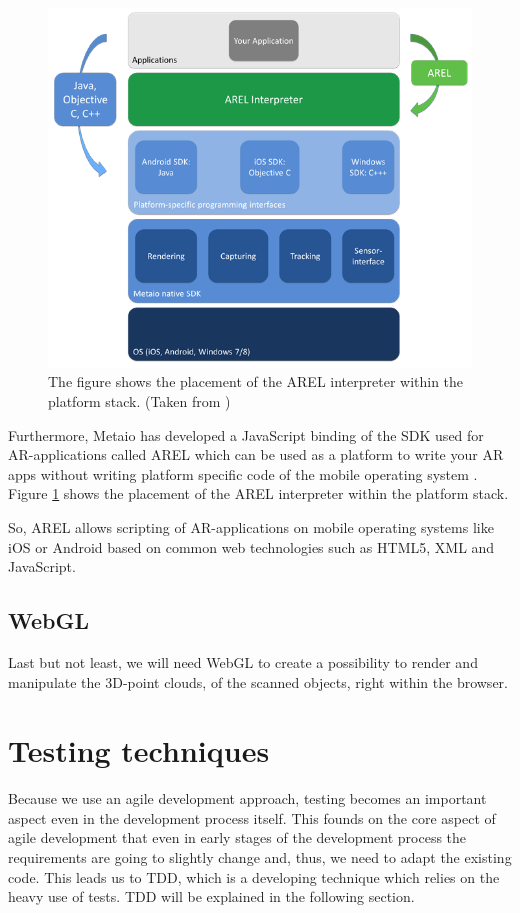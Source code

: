 \begin{figure}[th]
\centerline{\includegraphics[width=.7\textwidth]{gfx/stackAREL}}
\caption{The figure shows the placement of the AREL interpreter within the platform stack. (Taken from \cite{MetaioDEV})}
\label{stackArel}
\end{figure}

Furthermore, Metaio has developed a JavaScript binding of the SDK used for \ac{AR}-applications called \ac{AREL} which can be used as a platform to write your \ac{AR} apps without writing platform specific code of the mobile operating system \cite{MetaioDEV}. Figure \ref{stackArel} shows the placement of the \ac{AREL} interpreter within the platform stack. 

So, \ac{AREL} allows scripting of \ac{AR}-applications on mobile operating systems like iOS or Android based on common web technologies such as \ac{HTML5}, \ac{XML} and JavaScript. 

\subsection{WebGL}
Last but not least, we will need \ac{WebGL} to create a possibility to render and manipulate the 3D-point clouds, of the scanned objects, right within the browser.

\section{Testing techniques}	
Because we use an agile development approach, testing becomes an important aspect even in the development process itself. This founds on the core aspect of agile development that even in early stages of the development process the requirements are going to slightly change and, thus, we need to adapt the existing code. This leads us to \ac{TDD}, which is a developing technique which relies on the heavy use of tests. \ac{TDD} will be explained in the following section. 


